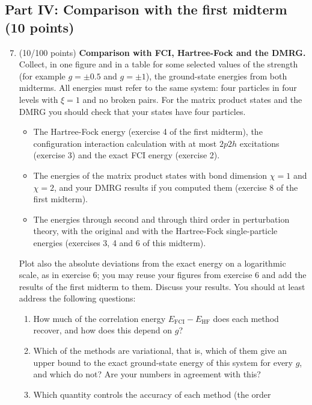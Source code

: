 \documentclass[prc]{revtex4}
\begin{document}
\subsection*{Part IV: Comparison with the first midterm (10 points)}

\begin{enumerate}
\setcounter{enumi}{6}

\item (10/100 points) \textbf{Comparison with FCI, Hartree-Fock and the DMRG.}
Collect, in one figure and in a table for some selected values of the
strength (for example $g=\pm 0.5$ and $g=\pm 1$), the ground-state
energies from both midterms. All energies must refer to the same
system: four particles in four levels with $\xi=1$ and no broken
pairs. For the matrix product states and the DMRG you should check
that your states have four particles.
\begin{itemize}
\item The Hartree-Fock energy (exercise 4 of the first midterm), the
  configuration interaction calculation with at most $2p2h$
  excitations (exercise 3) and the exact FCI energy (exercise 2).
\item The energies of the matrix product states with bond dimension
  $\chi=1$ and $\chi=2$, and your DMRG results if you computed them
  (exercise 8 of the first midterm).
\item The energies through second and through third order in
  perturbation theory, with the original and with the Hartree-Fock
  single-particle energies (exercises 3, 4 and 6 of this midterm).
\end{itemize}
Plot also the absolute deviations from the exact energy on a
logarithmic scale, as in exercise 6; you may reuse your figures from
exercise 6 and add the results of the first midterm to them. Discuss
your results. You should at least address the following questions:
\begin{enumerate}
\item How much of the correlation energy
  $E_{\mathrm{FCI}}-E_{\mathrm{HF}}$ does each method recover, and how
  does this depend on $g$?
\item Which of the methods are variational, that is, which of them
  give an upper bound to the exact ground-state energy of this system
  for every $g$, and which do not? Are your numbers in agreement with
  this?
\item Which quantity controls the accuracy of each method (the order

\end{enumerate}
\end{enumerate}
\end{document}
